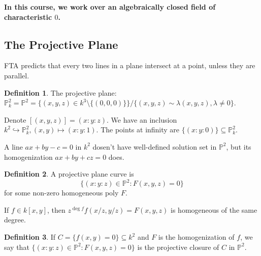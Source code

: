 \documentclass{article}
\theoremstyle{definition}
\newtheorem{defn}{Definition}[section]
\theoremstyle{remark}
\theoremstyle{plain}
\newcommand{\PP}{\mathbb{P}}
\begin{document}
\textbf{In this course, we work over an algebraically closed field of characteristic $0$.}

\subsection{The Projective Plane}
FTA predicts that every two lines in a plane intersect at a point, unless they are parallel.
\begin{defn}
    The projective plane: $\PP^2_k=\PP^2=\{(x,y,z)\in k^3\setminus\{(0,0,0)\}\}/\{(x,y,z)\sim\lambda(x,y,z),\lambda\neq 0\}$.
\end{defn}
Denote $[(x,y,z)]=(x:y:z)$. We have an inclusion $k^2\hookrightarrow\PP_k^2, (x,y)\mapsto (x:y:1)$. The points at infinity are $\{(x:y:0)\}\subseteq\PP_k^2$.

A line $ax+by-c=0$ in $k^2$ dosen't have well-defined solution set in $\PP^2$, but its homogenization $ax+by+cz=0$ does.

\begin{defn}
    A projective plane curve is
    \[\{(x:y:z)\in\PP^2\colon F(x,y,z)=0\}\]
    for some non-zero homogeneous poly $F$.
\end{defn}
If $f\in k[x,y]$, then $z^{\deg f}f(x/z,y/z)=F(x,y,z)$ is homogeneous of the same degree.
\begin{defn}
    If $C=\{f(x,y)=0\}\subseteq k^2$ and $F$ is the homogenization of $f$, we say that $\{(x:y:z)\in\PP^2:F(x,y,z)=0\}$ is the projective closure of $C$ in $\PP^2$.
\end{defn}
\end{document}
